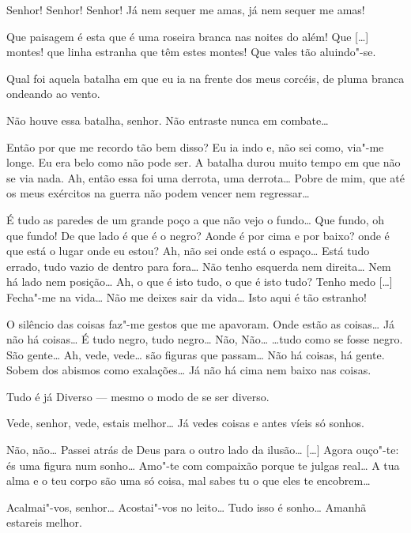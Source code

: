  Senhor! Senhor! Senhor! Já nem sequer me amas, já nem sequer me
amas!

 Que paisagem é esta que é uma roseira branca nas noites
do além! Que [\ldots{}] montes! que linha estranha que têm estes montes!
Que vales tão aluindo"-se.

 Qual foi aquela batalha em que eu ia na frente dos meus
corcéis, de pluma branca ondeando ao vento.

 Não houve essa batalha, senhor. Não entraste nunca em combate\ldots{}

 Então por que me recordo tão bem disso? Eu ia indo e, não
sei como, via"-me longe. Eu era belo como não pode ser. A batalha
durou muito tempo em que não se via nada. Ah, então essa foi uma
derrota, uma derrota\ldots{} Pobre de mim, que até os meus exércitos na
guerra não podem vencer nem regressar\ldots{}

 É tudo as paredes de um grande poço a que não vejo o
fundo\ldots{} Que fundo, oh que fundo! De que lado é que é o negro? Aonde
é por cima e por baixo? onde é que está o lugar onde eu estou? Ah,
não sei onde está o espaço\ldots{} Está tudo errado, tudo vazio de dentro
para fora\ldots{} Não tenho esquerda nem direita\ldots{} Nem há lado nem
posição\ldots{} Ah, o que é isto tudo, o que é isto tudo? Tenho medo [\ldots{}]
Fecha"-me na vida\ldots{} Não me deixes sair da vida\ldots{} Isto aqui é tão
estranho!

 O silêncio das coisas faz"-me gestos que me apavoram. Onde
estão as coisas\ldots{} Já não há coisas\ldots{} É tudo negro, tudo negro\ldots{} Não,
Não\ldots{} \ldots{}tudo como se fosse negro. São gente\ldots{} Ah, vede, vede\ldots{} são
figuras que passam\ldots{} Não há coisas, há gente. Sobem dos abismos como
exalações\ldots{} Já não há cima nem baixo nas coisas.

Tudo é já Diverso --- mesmo o modo de se ser diverso.

 Vede, senhor, vede, estais melhor\ldots{} Já vedes coisas e antes víeis
só sonhos.

 Não, não\ldots{} Passei atrás de Deus para o outro lado da
ilusão\ldots{} [\ldots{}] Agora ouço"-te: és uma figura num sonho\ldots{} Amo"-te com
compaixão porque te julgas real\ldots{} A tua alma e o teu corpo são uma
só coisa, mal sabes tu o que eles te encobrem\ldots{}

 Acalmai"-vos, senhor\ldots{} Acostai"-vos no leito\ldots{} Tudo isso é
sonho\ldots{} Amanhã estareis melhor.

